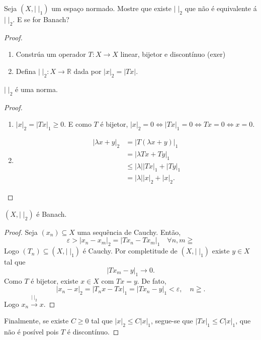 \documentclass[portuguese]{article}
\theoremstyle{definition}
\newcommand{\R}{\mathbb{R}}
\begin{document}
	\begin{exer*}[10]
		Seja $(X,|\;|_1)$ um espaço normado. Mostre que existe $|\;|_2$ que não é equivalente á $|\;|_2$. E se for Banach?
	\end{exer*}
	\begin{proof}\leavevmode
		\begin{enumerate}
			\item Constrúa um operador $T:X\to X$ linear, bijetor e discontínuo (exer)
			\item Defina $|\;|_2:X\to\R$ dada por $|x|_2=|Tx|$.
		\end{enumerate}
		\begin{af*}
			$|\;|_2$ é uma norma.
		\end{af*}
		\begin{proof}
			\begin{enumerate}
				\item $|x|_2=|Tx|_1\geq0$. E como $T$ é bijetor, $|x|_2=0\iff|Tx|_1=0\iff Tx=0\iff x=0$.
				\item \begin{align*}
					|\lambda x+y|_2&=|T(\lambda x+y)|_1\\
					&=|\lambda Tx+Ty|_1\\
					&\leq|\lambda||Tx|_1+|Ty|_1\\
					&=|\lambda||x|_2+|x|_2.
				\end{align*}
			\end{enumerate}
		\end{proof}
		\begin{af*}
			$(X,|\;|_2)$ é Banach.
		\end{af*}
		\begin{proof}
			Seja $(x_n)\subseteq X$ uma sequência de Cauchy. Então,
			\[\varepsilon>|x_n-x_m|_2=|Tx_n-Tx_m|_1\quad\forall n,m\geqq\]
			Logo $(T_n)\subseteq (X,|\;|_1)$ é Cauchy. Por completitude de $(X,|\;|_1)$ existe $y\in X$ tal que
			\[|Tx_m-y|_1\to0.\]
			Como $T$ é bijetor, existe $x\in X$ com $Tx=y$. De fato,
			\[|x_n-x|_2=|T_nx-Tx|_1=|Tx_n-y|_1<\varepsilon,\quad n\geqq.\]
			Logo $x_n\overset{|\;|_2}{\longrightarrow}x$.
		\end{proof}
		Finalmente, se existe $C\geq0$ tal que $|x|_2\leq C|x|_1$, segue-se que $|Tx|_1\leq C|x|_1$, que não é posível pois $T$ é discontínuo.
	\end{proof}
	
\end{document}
